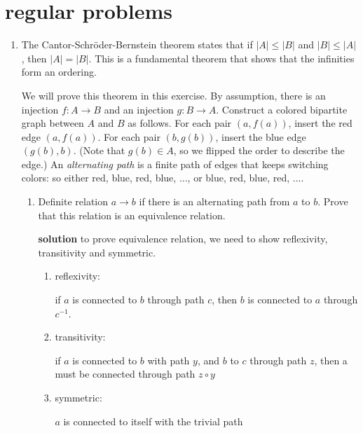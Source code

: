 \documentclass{article}
\begin{document}
\section{regular problems}
\begin{enumerate}
    
    \item The Cantor-Schr\"{o}der-Bernstein theorem states that if $|A| \leq |B|$ and $|B| \leq |A|$, then $|A| = |B|$. This is a fundamental theorem
            that shows that the infinities form an ordering.
    
            We will prove this theorem in this exercise. By assumption, there is an injection $f: A \to B$ and an injection $g: B \to A$. Construct a colored bipartite graph between
            $A$ and $B$ as follows. For each pair $(a, f(a))$, insert the red edge $(a, f(a))$. For each pair $(b, g(b))$, insert
            the blue edge $(g(b), b)$. (Note that $g(b) \in A$, so we flipped the order to describe the edge.) An \emph{alternating path} is 
            a finite path of edges that keeps switching colors: so either red, blue, red, blue, $\ldots$, or blue, red, blue, red, $\ldots$.
            \begin{enumerate}
                \item Definite relation $a \to b$ if there is an alternating path from $a$ to $b$. Prove that this relation is an equivalence relation.
                
                \textbf{solution}
                to prove equivalence relation, we need to show reflexivity, transitivity and symmetric.
    
                \begin{enumerate}
                    \item reflexivity:
                    
                    if \(a\) is connected to \(b\) through path \(c\), then \(b\) is connected to \(a\) through \(c^{-1}\).
    
                    \item transitivity:
                    
                    if \(a\) is connected to \(b\) with path \(y\), and \(b\) to \(c\) through path \(z\), then a must be connected through path \(z\circ y\)

                    \item symmetric:
                    
                    \(a\) is connected to itself with the trivial path
                \end{enumerate}
    

\end{enumerate}
\end{enumerate}
\end{document}
